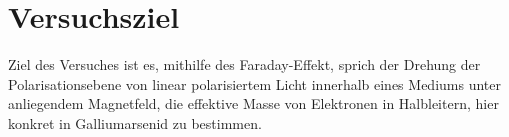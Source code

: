 \section{Versuchsziel}
\label{sec:versuchsziel}

Ziel des Versuches ist es, mithilfe des Faraday-Effekt, sprich der Drehung der Polarisationsebene von linear polarisiertem Licht
innerhalb eines Mediums unter anliegendem Magnetfeld, die effektive Masse von Elektronen in Halbleitern, hier konkret in Galliumarsenid 
zu bestimmen.
